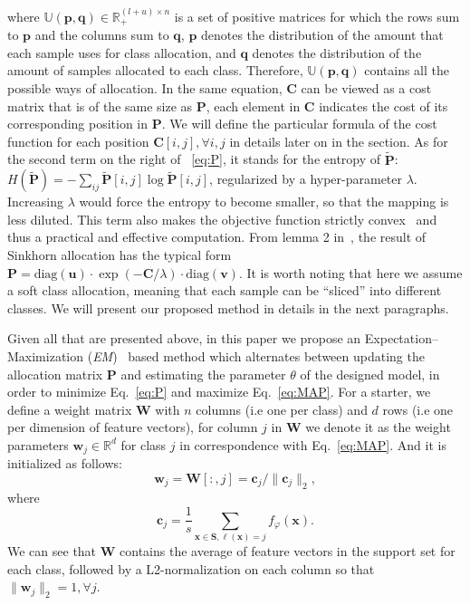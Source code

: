 \documentclass[review]{elsarticle}
\begin{document}
where $\mathbb{U}(\mathbf{p},\mathbf{q})\in\mathbb{R}_{+}^{(l+u) \times n}$ is a set of positive matrices for which the rows sum to $\mathbf{p}$ and the columns sum to $\mathbf{q}$, $\mathbf{p}$ denotes the distribution of the amount that each sample uses for class allocation, and $\mathbf{q}$ denotes the distribution of the amount of samples allocated to each class. Therefore, $\mathbb{U}(\mathbf{p},\mathbf{q})$ contains all the possible ways of allocation. In the same equation, $\mathbf{C}$ can be viewed as a cost matrix that is of the same size as $\mathbf{P}$, each element in $\mathbf{C}$ indicates the cost of its corresponding position in $\mathbf{P}$. We will define the particular formula of the cost function for each position $\mathbf{C}[i,j], \forall i,j$ in details later on in the section. As for the second term on the right of ~\ref{eq:P}, it stands for the entropy of $\mathbf{\tilde{P}}$: $H(\mathbf{\tilde{P}})=-\sum_{ij}\mathbf{\tilde{P}}[i,j]\log \mathbf{\tilde{P}}[i,j]$, regularized by a hyper-parameter $\lambda$. Increasing $\lambda$ would force the entropy to become smaller, so that the mapping is less diluted. This term also makes the objective function strictly convex~\cite{cuturi2013sinkhorn, solomon2015convolutional} and thus a practical and effective computation. 
From lemma 2 in~\cite{cuturi2013sinkhorn}, the result of Sinkhorn allocation has the typical form $\mathbf{P} = \text{diag}(\mathbf{u}) \cdot \exp(-\mathbf{C}/\lambda) \cdot \text{diag}(\mathbf{v})$. It is worth noting that here we assume a soft class allocation, meaning that each sample can be ``sliced'' into different classes. We will present our proposed method in details in the next paragraphs.

Given all that are presented above, in this paper we propose an Expectation–Maximization (\emph{EM})~\cite{dempster1977maximum} based method which alternates between updating the allocation matrix $\mathbf{P}$ and estimating the parameter $\theta$ of the designed model, in order to minimize Eq.~\ref{eq:P} and maximize Eq.~\ref{eq:MAP}. For a starter, we define a weight matrix $\mathbf{W}$ with $n$ columns (i.e one per class) and $d$ rows (i.e one per dimension of feature vectors), for column $j$ in $\mathbf{W}$ we denote it as the weight parameters $\mathbf{w}_j\in\mathbb{R}^d$ for class $j$ in correspondence with Eq.~\ref{eq:MAP}. And it is initialized as follows:
\begin{equation}
    \mathbf{w}_j = \mathbf{W}[:, j] = \mathbf{c}_j / \|\mathbf{c}_j\|_2, 
\label{eq:init_W_1}
\end{equation}
where 
\begin{equation}
\mathbf{c}_j = \frac{1}{s} \sum_{\mathbf{x}\in \mathbf{S}, \ell(\mathbf{x}) = j}{f_\varphi(\mathbf{x})}.
\label{eq:init_c}
\end{equation}
We can see that $\mathbf{W}$ contains the average of feature vectors in the support set for each class, followed by a L2-normalization on each column so that $\|\mathbf{w}_j\|_2=1, \forall j$. 
\end{document}
